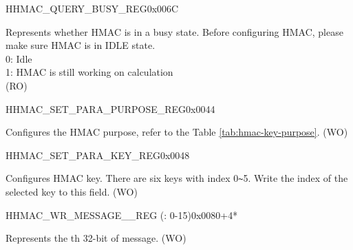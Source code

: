 \begin{register}{H}{HMAC\_QUERY\_BUSY\_REG}{0x006C}\label{regdesc:HMACQUERYBUSYREG}
%
%
\regnewline%
\begin{regdesc}\begin{reglist}
\label{fielddesc:HMACBUSYSTATE}\item [HMAC\_BUSY\_STATE] Represents whether HMAC is in a busy state. Before configuring HMAC, please make sure HMAC is in IDLE state.
\\0: Idle
\\1: HMAC is still working on calculation
\\(RO)
\end{reglist}\end{regdesc}
\end{register}


\begin{register}{H}{HMAC\_SET\_PARA\_PURPOSE\_REG}{0x0044}\label{regdesc:HMACSETPARAPURPOSEREG}
%
%
\regnewline%
\begin{regdesc}\begin{reglist}
\label{fielddesc:HMACPURPOSESET}\item [HMAC\_PURPOSE\_SET] Configures the HMAC purpose, refer to the Table \ref{tab:hmac-key-purpose}. (WO)
\end{reglist}\end{regdesc}
\end{register}


\begin{register}{H}{HMAC\_SET\_PARA\_KEY\_REG}{0x0048}\label{regdesc:HMACSETPARAKEYREG}
%
%
\regnewline%
\begin{regdesc}\begin{reglist}
\label{fielddesc:HMACKEYSET}\item [HMAC\_KEY\_SET] Configures HMAC key. There are six keys with index 0\verb+~+5. Write the index of the selected key to this field. (WO)
\end{reglist}\end{regdesc}
\end{register}


\begin{register}{H}{HMAC\_WR\_MESSAGE\_\_REG (: 0-15)}{0x0080+4*}\label{regdesc:HMACWRMESSAGENREG}
%
\regnewline%
\begin{regdesc}\begin{reglist}
\label{fielddesc:HMACWDATAN}\item [HMAC\_WDATA\_\regindex{n}] Represents the th 32-bit of message. (WO)
\end{reglist}\end{regdesc}
\end{register}


